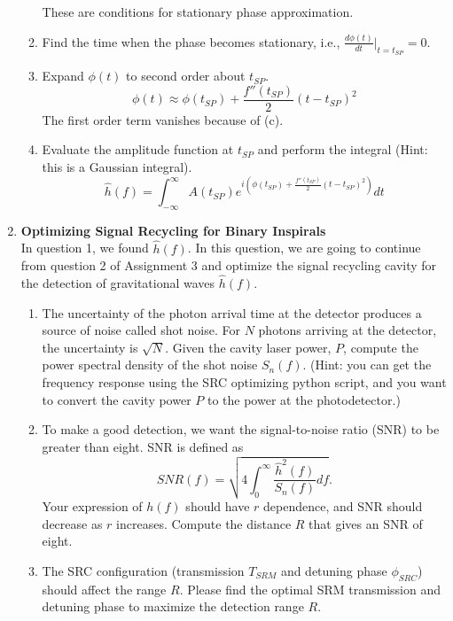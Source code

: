 \documentclass[12pt,twoside]{article}
\begin{document}
\begin{enumerate}
\begin{enumerate}
    These are conditions for stationary phase approximation.
    \item Find the time when the phase becomes stationary, i.e., $\frac{d\phi(t)}{dt}|_{t=t_{SP}}=0$.
    \item Expand $\phi(t)$ to second order about $t_{SP}$. 
    \begin{equation}
        \phi(t)\approx\phi(t_{SP})+\frac{f''(t_{SP})}{2}(t-t_{SP})^2
    \end{equation}
    The first order term vanishes because of (c).
    \item Evaluate the amplitude function at $t_{SP}$ and perform the integral (Hint: this is a Gaussian integral).
    \begin{equation}
        \hat{h}(f)=\int_{-\infty}^\infty A(t_{SP})e^{i(\phi(t_{SP})+\frac{f''(t_{SP})}{2}(t-t_{SP})^2)}dt
    \end{equation}
\end{enumerate}



\item {\bf Optimizing Signal Recycling for Binary Inspirals}\\
In question 1, we found $\hat{h}(f)$. In this question, we are going to continue from question 2 of Assignment 3 and optimize the signal recycling cavity for the detection of gravitational waves $\hat{h}(f)$.
\begin{enumerate}
    \item The uncertainty of the photon arrival time at the detector produces a source of noise called shot noise. 
    For $N$ photons arriving at the detector, the uncertainty is $\sqrt{N}$. 
    Given the cavity laser power, $P$, compute the power spectral density of the shot noise $S_n(f)$. (Hint: you can get the frequency response using the SRC optimizing python script, and you want to convert the cavity power $P$ to the power at the photodetector.)
    \item To make a good detection, we want the signal-to-noise ratio (SNR) to be greater than eight. SNR is defined as
    \begin{equation}
        SNR(f)=\sqrt{4\int_0^\infty \frac{\hat{h}^2(f)}{S_n(f)}df}.
    \end{equation}
    Your expression of $h(f)$ should have $r$ dependence, and SNR should decrease as $r$ increases. Compute the distance $R$ that gives an SNR of eight.
    \item The SRC configuration (transmission $T_{SRM}$ and detuning phase $\phi_{SRC}$) should affect the range $R$. Please find the optimal SRM transmission and detuning phase to maximize the detection range $R$.
\end{enumerate}




\end{enumerate}
\end{document}
